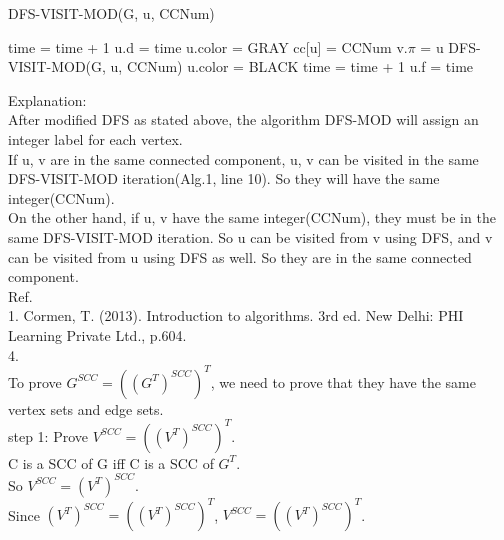 \documentclass{article}
\begin{document}
\begin{algorithm}[H]
	\caption{DFS-VISIT-MOD(G, u, CCNum)}
	time = time + 1\;
	u.d = time\;
	u.color = GRAY\;
	cc[u] = CCNum\;
	{
		{
			v.$\pi$ = u\;
			DFS-VISIT-MOD(G, u, CCNum)\;
		}
	}
	u.color = BLACK\;
	time = time + 1\;
	u.f = time\;
\end{algorithm}

Explanation:\\
After modified DFS as stated above, the algorithm DFS-MOD will assign an integer label for each vertex. \\
If u, v are in the same connected component, u, v can be visited in the same DFS-VISIT-MOD iteration(Alg.1, line 10). So they will have the same integer(CCNum).\\
On the other hand, if u, v have the same integer(CCNum), they must be in the same DFS-VISIT-MOD iteration. So u can be visited from v using DFS, and v can be visited from u using DFS as well. So they are in the same connected component.\\

Ref.\\
1. Cormen, T. (2013). Introduction to algorithms. 3rd ed. New Delhi: PHI Learning Private Ltd., p.604.\\

4.\\
To prove $G^{SCC}=((G^T)^{SCC})^T$, we need to prove that they have the same vertex sets and edge sets.\\

step 1: Prove $V^{SCC} = ((V^T)^{SCC})^T$.\\
C is a SCC of G iff C is a SCC of $G^T$.\\
So $V^{SCC} = (V^T)^{SCC}$.\\
Since $(V^T)^{SCC} = ((V^T)^{SCC})^T$, $V^{SCC} = ((V^T)^{SCC})^T$.\\
\end{document}
